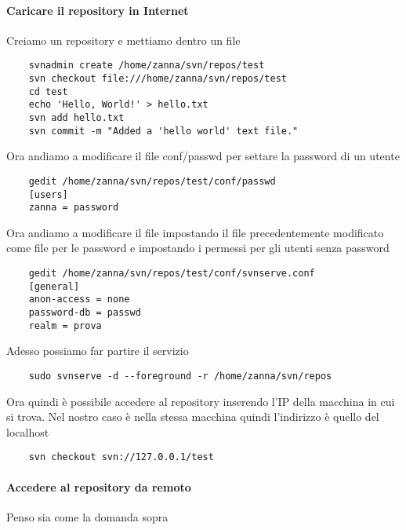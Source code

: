\documentclass[a4paper]{article}
\begin{document}
	\paragraph{Caricare il repository in Internet}
	\label{svn:repository:internet}
	Creiamo un repository e mettiamo dentro un file
	\begin{verbatim}
	svnadmin create /home/zanna/svn/repos/test
	svn checkout file:///home/zanna/svn/repos/test
	cd test
	echo 'Hello, World!' > hello.txt
	svn add hello.txt
	svn commit -m "Added a 'hello world' text file."
	\end{verbatim}
	Ora andiamo a modificare il file conf/passwd per settare la password di un utente
	\begin{verbatim}
	gedit /home/zanna/svn/repos/test/conf/passwd
	[users] 
	zanna = password
	\end{verbatim}
	Ora andiamo a modificare il file  impostando il file precedentemente modificato come file per le password e impostando i permessi per gli utenti senza password
	\begin{verbatim}
	gedit /home/zanna/svn/repos/test/conf/svnserve.conf
	[general] 
	anon-access = none 
	password-db = passwd 
	realm = prova
	\end{verbatim}
	Adesso possiamo far partire il servizio
	\begin{verbatim}
	sudo svnserve -d --foreground -r /home/zanna/svn/repos
	\end{verbatim}
	Ora quindi è possibile accedere al repository inserendo l'IP della macchina in cui si trova. Nel  nostro caso è nella stessa macchina quindi l'indirizzo è quello del localhost
	\begin{verbatim}
	svn checkout svn://127.0.0.1/test
	\end{verbatim}
	
	\paragraph{Accedere al repository da remoto}
	Penso sia come la domanda sopra
	
\end{document}
